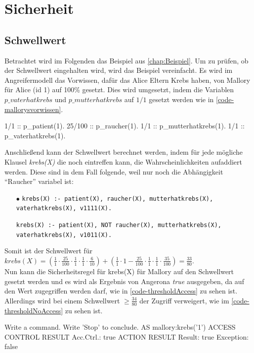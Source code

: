 \documentclass[german,version-2020-11]{uzl-thesis}
\begin{document}
\section{Sicherheit}
\subsection{Schwellwert}\label{sub:schwellwert}
Betrachtet wird im Folgenden das Beispiel aus \autoref{chap:Beispiel}. Um zu prüfen, ob der Schwellwert eingehalten wird, wird das Beispiel vereinfacht. Es wird im Angreifermodell das Vorwissen, dafür das Alice Eltern Krebs haben, von Mallory für Alice (id 1) auf 100\% gesetzt. Dies wird umgesetzt, indem die Variablen $p\_vaterhatkrebs$ und $p\_mutterhatkrebs$ auf $1/1$ gesetzt werden wie in \autoref{code-mallorysvorwissen}.
\begin{Pseudocode}[caption={Mallorys Vorwissen}, label={code-mallorysvorwissen}]
1/1 :: p\_patient(1).
25/100 :: p_raucher(1).
1/1 :: p_mutterhatkrebs(1).
1/1 :: p_vaterhatkrebs(1).
\end{Pseudocode}
Anschließend kann der Schwellwert berechnet werden, indem für jede mögliche Klausel \textit{krebs(X)} die noch eintreffen kann, die Wahrscheinlichkeiten aufaddiert werden. Diese sind in dem Fall folgende, weil nur noch die Abhängigkeit \enquote{Raucher} variabel ist:
\begin{itemize}
	\item[$\bullet$] \texttt{krebs(X) :- patient(X), raucher(X), mutterhatkrebs(X), vaterhatkrebs(X), v1111(X).}
	\item[\bullet] \texttt{krebs(X) :- patient(X), NOT raucher(X), mutterhatkrebs(X), vaterhatkrebs(X), v1011(X).}
\end{itemize}
Somit ist der Schwellwert für $krebs(X) = (\frac{1}{1} \cdot \frac{25}{100} \cdot \frac{1}{1} \cdot \frac{1}{1} \cdot \frac{6}{10}) + (\frac{1}{1} \cdot 1- \frac{25}{100} \cdot \frac{1}{1} \cdot \frac{1}{1} \cdot \frac{35}{100}) = \frac{33}{80} $. \\  Nun kann die Sicherheitsregel für krebs(X) für Mallory auf den Schwellwert gesetzt werden und es wird als Ergebnis von Angerona \textit{true} ausgegeben, da auf den Wert zugegriffen werden darf, wie in \autoref{code-thresholdAccess} zu sehen ist. Allerdings wird bei einem Schwellwert $ \geq \frac{34}{80}$ der Zugriff verweigert, wie im \ref{code-thresholdNoAccess} zu sehen ist. 


\begin{Pseudocode}[caption={Angerona Ergebnis für Schwellwert=$\frac{33}{80}$}, label={code-thresholdAccess}]
Write a command. Write 'Stop' to conclude.
AS mallory:krebs('1')
ACCESS CONTROL RESULT
	Acc.Ctrl.: true
ACTION RESULT
	Result: true Exception: false
\end{Pseudocode}
\end{document}
